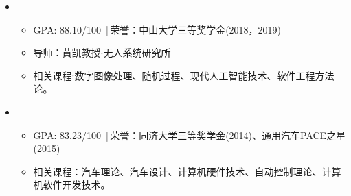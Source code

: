   \begin{itemize}[leftmargin=*]
    \item
      {\small
      \begin{itemize}
         \item{GPA: 88.10/100 $\,$|$\,$荣誉：中山大学三等奖学金(2018，2019)}
         \item{导师：黄凯教授$\cdot$无人系统研究所}
         \item{相关课程:数字图像处理、随机过程、现代人工智能技术、软件工程方法论。}
      \end{itemize}
      }
    \item
      {\small
      \begin{itemize}
         \item{GPA: 83.23/100} $\,$|$\,$荣誉：同济大学三等奖学金(2014)、通用汽车PACE之星(2015)
	     \item{相关课程：汽车理论、汽车设计、计算机硬件技术、自动控制理论、计算机软件开发技术。}
      \end{itemize}
      }
  \end{itemize}
